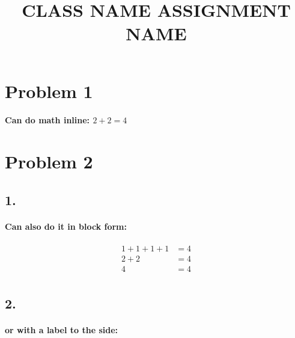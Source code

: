 \documentclass{article} %
\title{CLASS NAME ASSIGNMENT NAME}
\author[1]{}
\begin{document}
    
    \maketitle %

    \newpage %

    \section*{Problem 1}
    
    \paragraph{Can do math inline: $2 + 2 = 4$ }

    \section*{Problem 2} %

        \subsection*{1.} %

        \paragraph{Can also do it in block form:} %

        \begin{align*}
            1+1+1+1 & = 4 \\
            2+2 & = 4 \\
            4 & = 4 \\
        \end{align*}

        \subsection*{2.}

        \paragraph{or with a label to the side:}
\end{document}
